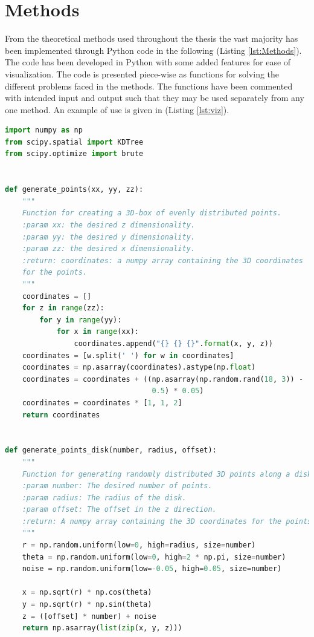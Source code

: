 \documentclass[%
]{USN-MSc}
\begin{document}
\section{Methods}
\label{app:Methods}
From the theoretical methods used throughout the thesis the vast majority has been implemented through Python code in the following (Listing \ref{lst:Methods}). The code has been developed in Python with some added features for ease of visualization. The code is presented piece-wise as functions for solving the different problems faced in the methods. The functions have been commented with intended input and output such that they may be used separately from any one method. An example of use is given in (Listing \ref{lst:viz}).

\begin{lstlisting}[language=Python, caption=Methods implemented in code, label={lst:Methods}]
import numpy as np
from scipy.spatial import KDTree
from scipy.optimize import brute


def generate_points(xx, yy, zz):
    """
    Function for creating a 3D-box of evenly distributed points.
    :param xx: the desired z dimensionality.
    :param yy: the desired y dimensionality.
    :param zz: the desired x dimensionality.
    :return: coordinates: a numpy array containing the 3D coordinates
    for the points.
    """
    coordinates = []
    for z in range(zz):
        for y in range(yy):
            for x in range(xx):
                coordinates.append("{} {} {}".format(x, y, z))
    coordinates = [w.split(' ') for w in coordinates]
    coordinates = np.asarray(coordinates).astype(np.float)
    coordinates = coordinates + ((np.asarray(np.random.rand(18, 3)) - 
                                  0.5) * 0.05)
    coordinates = coordinates * [1, 1, 2]
    return coordinates


def generate_points_disk(number, radius, offset):
    """
    Function for generating randomly distributed 3D points along a disk.
    :param number: The desired number of points.
    :param radius: The radius of the disk.
    :param offset: The offset in the z direction.
    :return: A numpy array containing the 3D coordinates for the points.
    """
    r = np.random.uniform(low=0, high=radius, size=number)
    theta = np.random.uniform(low=0, high=2 * np.pi, size=number)
    noise = np.random.uniform(low=-0.05, high=0.05, size=number)

    x = np.sqrt(r) * np.cos(theta)
    y = np.sqrt(r) * np.sin(theta)
    z = ([offset] * number) + noise
    return np.asarray(list(zip(x, y, z)))



\end{lstlisting}
\end{document}

